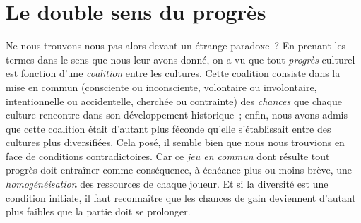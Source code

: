 \documentclass[french,twoside]{book} %
\begin{document}
\section[{Le double sens du progrès}]{Le double sens du progrès}
\renewcommand{\leftmark}{Le double sens du progrès}

\noindent Ne nous trouvons-nous pas alors devant un étrange paradoxe ? En prenant les termes dans le sens que nous leur avons donné, on a vu que tout \emph{progrès} culturel est fonction d’une \emph{coalition} entre les cultures. Cette coalition consiste dans la mise en commun (consciente ou inconsciente, volontaire ou involontaire, intentionnelle ou accidentelle, cherchée ou contrainte) des \emph{chances} que chaque culture rencontre dans son développement historique ; enfin, nous avons admis que cette coalition était d’autant plus féconde qu’elle s’établissait entre des cultures plus diversifiées. Cela posé, il semble bien que nous nous trouvions en face de conditions contradictoires. Car ce \emph{jeu en commun} dont résulte tout progrès doit entraîner comme conséquence, à échéance plus ou moins brève, une \emph{homogénéisation} des ressources de chaque joueur. Et si la diversité est une condition initiale, il faut reconnaître que les chances de gain deviennent d’autant plus faibles que la partie doit se prolonger.\par
\end{document}
